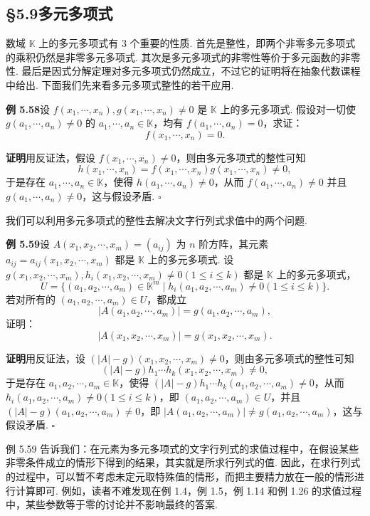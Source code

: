 \documentclass[UTF8,12pt,a4paper,fontset=fandol]{ctexart}
\begin{document}
\subsection*{§5.9\quad 多元多项式}

数域 $\mathbb{K}$ 上的多元多项式有 3 个重要的性质. 首先是整性，即两个非零多元多项式的乘积仍然是非零多元多项式. 其次是多元多项式的非零性等价于多元函数的非零性. 最后是因式分解定理对多元多项式仍然成立，不过它的证明将在抽象代数课程中给出. 下面我们先来看多元多项式整性的若干应用.

\noindent\textbf{例 5.58}\quad 设 $f(x_1,\cdots,x_n),g(x_1,\cdots,x_n)\ne0$ 是 $\mathbb{K}$ 上的多元多项式. 假设对一切使 $g(a_1,\cdots,a_n)\ne0$ 的 $a_1,\cdots,a_n\in\mathbb{K}$，均有 $f(a_1,\cdots,a_n)=0$，求证：
\[
f(x_1,\cdots,x_n)=0.
\]

\noindent\textbf{证明}\quad 用反证法，假设 $f(x_1,\cdots,x_n)\ne0$，则由多元多项式的整性可知
\[
h(x_1,\cdots,x_n)=f(x_1,\cdots,x_n)g(x_1,\cdots,x_n)\ne0,
\]
于是存在 $a_1,\cdots,a_n\in\mathbb{K}$，使得 $h(a_1,\cdots,a_n)\ne0$，从而 $f(a_1,\cdots,a_n)\ne0$ 并且 $g(a_1,\cdots,a_n)\ne0$，这与假设矛盾. \hfill $\square$

我们可以利用多元多项式的整性去解决文字行列式求值中的两个问题.

\noindent\textbf{例 5.59}\quad 设 $A(x_1,x_2,\cdots,x_m)=(a_{ij})$ 为 $n$ 阶方阵，其元素 $a_{ij}=a_{ij}(x_1,x_2,\cdots,x_m)$ 都是 $\mathbb{K}$ 上的多元多项式. 设 $g(x_1,x_2,\cdots,x_m),h_i(x_1,x_2,\cdots,x_m)\ne0(1\le i\le k)$ 都是 $\mathbb{K}$ 上的多元多项式，
\[
U=\{(a_1,a_2,\cdots,a_m)\in\mathbb{K}^m\mid h_i(a_1,a_2,\cdots,a_m)\ne0(1\le i\le k)\}.
\]
若对所有的 $(a_1,a_2,\cdots,a_m)\in U$，都成立
\[
|A(a_1,a_2,\cdots,a_m)|=g(a_1,a_2,\cdots,a_m),
\]
证明：
\[
|A(x_1,x_2,\cdots,x_m)|=g(x_1,x_2,\cdots,x_m).
\]

\noindent\textbf{证明}\quad 用反证法，设 $(|A|-g)(x_1,x_2,\cdots,x_m)\ne0$，则由多元多项式的整性可知
\[
(|A|-g)h_1\cdots h_k(x_1,x_2,\cdots,x_m)\ne0,
\]
于是存在 $a_1,a_2,\cdots,a_m\in\mathbb{K}$，使得 $(|A|-g)h_1\cdots h_k(a_1,a_2,\cdots,a_m)\ne0$，从而 $h_i(a_1,a_2,\cdots,a_m)\ne0(1\le i\le k)$，即 $(a_1,a_2,\cdots,a_m)\in U$，并且 $(|A|-g)(a_1,a_2,\cdots,a_m)\ne0$，即 $|A(a_1,a_2,\cdots,a_m)|\ne g(a_1,a_2,\cdots,a_m)$，这与假设矛盾. \hfill $\square$

例 5.59 告诉我们：在元素为多元多项式的文字行列式的求值过程中，在假设某些非零条件成立的情形下得到的结果，其实就是所求行列式的值. 因此，在求行列式的过程中，可以暂不考虑未定元取特殊值的情形，而把主要精力放在一般的情形进行计算即可. 例如，读者不难发现在例 1.4，例 1.5，例 1.14 和例 1.26 的求值过程中，某些参数等于零的讨论并不影响最终的答案.
\end{document}
